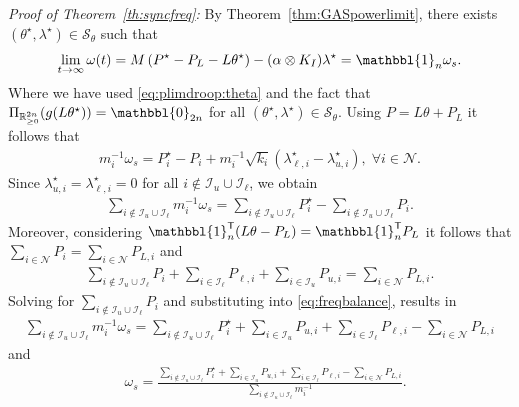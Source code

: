 \documentclass[twocolumn,twoside,journal]{IEEEtran}
\newcommand{\mc}{\mathcal}
\begin{document}
\textit{Proof of Theorem~\ref{th:syncfreq}:} By Theorem~\ref{thm:GASpowerlimit}, there exists $(\theta^\star,\lambda^\star) \in \mc S_\theta$ such that
\begin{align*}
    \lim_{t \to \infty} \omega(t) =  M \left(P^\star - P_{L} - L \theta^\star \right) - (\alpha \otimes K_I) \lambda^\star = \mathbbl{1}_n \omega_{s}.
\end{align*}
%
Where we have used \eqref{eq:plimdroop:theta} and the fact that $\Pi_{\mathbb{R}^{2n}_{\geq 0}}(g(L\theta^\star))=\mathbbl{0}_{2n}$ for all $(\theta^\star, \lambda^\star) \in \mc S_\theta$. Using $P=L\theta + P_L$ it follows that
%
\begin{align}\label{eq:omegas}
   m^{-1}_i \omega_{s} = P^\star_i - P_i + m_i^{-1} \sqrt{k_i}(\lambda^\star_{\ell,i} - \lambda^\star_{u,i}), \; \forall i \in \mc N.
\end{align}
%
Since $\lambda^\star_{u,i}=\lambda^\star_{\ell,i}=0$ for all $i\notin \mc I_u \cup \mc I_\ell$, we obtain
\begin{align}\label{eq:freqbalance}
     \sum\nolimits_{i\notin \mc I_u \cup \mc I_\ell}  m^{-1}_i \omega_{s} = \sum\nolimits_{i\notin \mc I_u \cup \mc I_\ell} P^\star_i - \sum\nolimits_{i\notin \mc I_u \cup \mc I_\ell}  P_i.
\end{align}
%
Moreover, considering $\mathbbl{1}^\mathsf{T}_n (L \theta - P_L) = \mathbbl{1}^\mathsf{T}_n P_L$ it follows that $\sum_{i \in \mc N} P_i = \sum_{i \in \mc N} P_{L,i}$ and
\begin{align*}
    \sum\nolimits_{i \notin \mc I_u \cup \mc I_\ell} P_i + \sum\nolimits_{i \in \mc I_\ell} P_{\ell,i} + \sum\nolimits_{i \in \mc I_u} P_{u,i}   = \sum\nolimits_{i \in \mc N} P_{L,i}.
\end{align*}
Solving for $\sum_{i \notin \mc I_u \cup \mc I_\ell} P_i$ and substituting into \eqref{eq:freqbalance}, results in
\begin{align*}
    \sum_{i \notin \mathcal{I}_{u} \cup \mathcal{I}_{\ell}}\! m_{i}^{-1} \omega_{s} \!= \!\sum_{i \notin \mathcal{I}_{u} \cup \mathcal{I}_{\ell}}\! P^\star_i + \sum_{i \in \mathcal{I}_{u}}\! P_{u, i} + \sum_{i \in \mathcal{I}_{\ell}}\! P_{\ell, i} - \sum_{i \in \mc N}\! P_{L,i}
\end{align*}
and
\begin{align}
    &\omega_s =\frac{\sum_{i \notin \mathcal{I}_{u} \cup \mathcal{I}_{\ell}} \! P_i^\star+ \sum_{i \in \mathcal{I}_u}\! P_{u, i}+\sum_{i \in \mathcal{I}_\ell} \! P_{\ell, i}-\sum_{i \in \mathcal{N}}\! P_{L, i}}{\sum_{i \notin \mathcal{I}_{u} \cup \mathcal{I}_{\ell}}\! m_i^{-1}}. \label{eq:omega_iliu}
\end{align}
\end{document}
